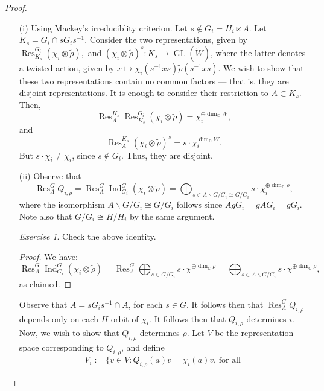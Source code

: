 \documentclass[a4paper]{report}
\theoremstyle{definition}
\theoremstyle{remark}
\theoremstyle{proposition}
\theoremstyle{conjecture}
\theoremstyle{lemma}
\theoremstyle{corollary}
\theoremstyle{exercise}
\newtheorem{exercise}{Exercise}
\theoremstyle{example}
\newcommand{\C}{\mathbb{C}}
\newcommand{\on}{\operatorname}
\begin{document}
\begin{proof}
    \leavevmode 
    \begin{itemize}
        \item[(i)] Using Mackey's irreduciblity criterion. Let 
            $s \not\in G_i = H_i\ltimes A$. Let $K_s = G_i \cap s G_is^{-1}$.
            Consider the two representations, given by
            $\on{Res}^{G_i}_{K_s}(\chi_i\otimes\widetilde{\rho}),$
        and $(\chi_i\otimes \widetilde{\rho})^s : K_s \to \on{GL}(\widetilde{W})$, where the latter denotes a twisted action, given by 
        $x\mapsto \chi_i(s^{-1}xs)\widetilde{\rho}(s^{-1}xs)$.
        We wish to show that these two representations contain no common
        factors --- that is, they are disjoint representations.
        It is enough to consider their restriction to $A\subset K_s$.
        Then, 
        $$\on{Res}_A^{K_s}\on{Res}_{K_s}^{G_i}(\chi_i\otimes\widetilde{\rho}) = \chi_i^{\oplus \dim_\C W},$$
        and 
        $$\on{Res}_A^{K_s}(\chi_i\otimes \widetilde{\rho})^s = s\cdot \chi_i^{\dim_\C W}.$$
        But $s\cdot \chi_i\neq \chi_i$, since $s\not\in G_i$. Thus, they 
        are disjoint.
    \item[(ii)] 
        Observe that 
        $$\on{Res}_A^G Q_{i,\rho} = \on{Res}_A^G\on{Ind}_{G_i}^G(\chi_i\otimes\widetilde{\rho}) = \bigoplus_{s\in A\backslash G/G_i \cong G/G_i} s\cdot \chi_i^{\oplus \dim_\C\rho},$$
        where the isomorphism $A\backslash G/G_i \cong G/G_i$ follows
        since $AgG_i = gAG_i = gG_i$. Note also that 
        $G/G_i\cong H/H_i$ by the same argument.
        \begin{exercise}
            Check the above identity.
        \end{exercise}
        \begin{proof}
            We have: $$\on{Res}_A^G \on{Ind}_{G_i}^G (\chi_i\otimes\widetilde{\rho}) = \on{Res}_A^G \bigoplus_{s \in G/G_i} s\cdot \chi^{\oplus\dim_\C\rho} = \bigoplus_{s \in A\backslash G/G_i} s\cdot \chi^{\oplus\dim_\C\rho},$$
            as claimed.
        \end{proof}
        Observe that $A = sG_is^{-1} \cap A$, for each $s\in G$.
        It follows then that 
        $\on{Res}_A^GQ_{i,\rho}$ depends only on each $H$-orbit of $\chi_i$.
        It follows then that $Q_{i,\rho}$ determines $i$.
        Now, we wish to show that $Q_{i,\rho}$ determines $\rho$.
        Let $V$ be the representation space corresponding to $Q_{i,\rho}$,
        and define 
        $$V_i := \lbrace v\in V : \text{$Q_{i,\rho}(a)v = \chi_i(a)v$, for all 
}$$
\end{itemize}
\end{proof}
\end{document}
